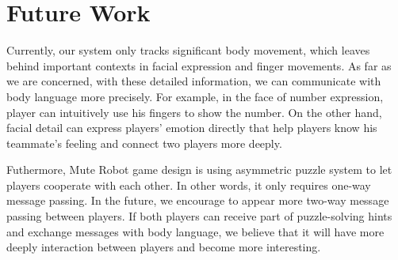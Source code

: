 \documentclass{chi-ext}
\begin{document}




\section{Future Work}

Currently, our system only tracks significant body movement, which leaves behind important contexts in facial expression and finger movements. As far as we are concerned, with these detailed information, we can communicate with body language more precisely. For example, in the face of number expression, player can intuitively use his fingers to show the number. On the other hand, facial detail can express players' emotion directly that help players know his teammate's feeling and connect two players more deeply.


Futhermore, Mute Robot game design is using asymmetric puzzle system to let players cooperate with each other. In other words, it only requires one-way message passing.
In the future, we encourage to appear more two-way message passing between players. 
If both players can receive part of puzzle-solving hints and exchange messages with body language, we believe that it will have more deeply interaction between players and become more interesting.

\end{document}
